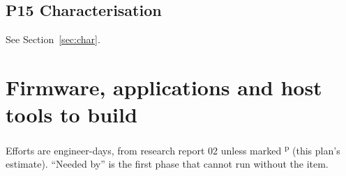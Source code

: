 \documentclass[10pt,a4paper]{article}
\begin{document}
\subsection*{P15 Characterisation}
See Section~\ref{sec:char}.

\section{Firmware, applications and host tools to build}\label{sec:fw}
Efforts are engineer-days, from research report 02 unless marked \textsuperscript{p} (this plan's estimate). ``Needed by'' is the first phase that cannot run without the item.
\end{document}
